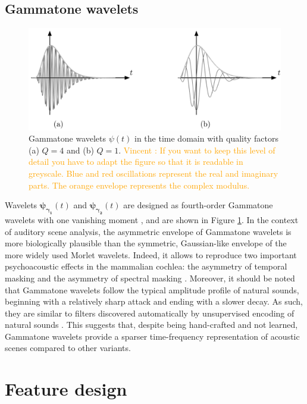\documentclass[journal]{IEEEtran}
\newcommand{\vl}[1]{\textcolor{orange}{Vincent : #1}}
\begin{document}
\subsection{Gammatone wavelets}
\begin{figure}
\begin{center}
\includegraphics[width=\columnwidth]{bw/gammatones}
\caption{
\label{fig:gammatones}
Gammatone wavelets $\psi(t)$ in the time domain with quality factors (a) $Q = 4$ and (b) $Q = 1$. 
\vl{If you want to keep this level of detail you have to adapt the figure so that it is readable in greyscale. Blue and red oscillations represent the real and imaginary parts. The orange envelope represents the complex modulus.}
}
\end{center}
\end{figure}
Wavelets
$\boldsymbol{\psi_{\gamma_1}}(t)$ and $\boldsymbol{\psi_{\gamma_2}}(t)$ are designed as fourth-order Gammatone
wavelets with one vanishing moment \cite{Venkitaraman2014}, and are shown in Figure \ref{fig:gammatones}.
In the context of auditory scene analysis, the asymmetric envelope of Gammatone wavelets is more biologically plausible than the symmetric, Gaussian-like envelope of the more widely used Morlet wavelets.
Indeed, it allows to reproduce two important psychoacoustic effects in the mammalian cochlea: the asymmetry of temporal masking and the asymmetry of spectral masking  \cite{Fastl2007}.
Moreover, it should be noted that Gammatone wavelets follow the typical amplitude profile of natural sounds, beginning with a relatively sharp attack and ending with a slower decay.
As such, they are similar to filters discovered automatically by unsupervised encoding of natural sounds \cite{Smith2006}.
This suggests that, despite being hand-crafted and not learned, Gammatone wavelets provide a sparser time-frequency representation of acoustic scenes compared to other variants.

\section{Feature design}
\label{sec:design}
\end{document}

